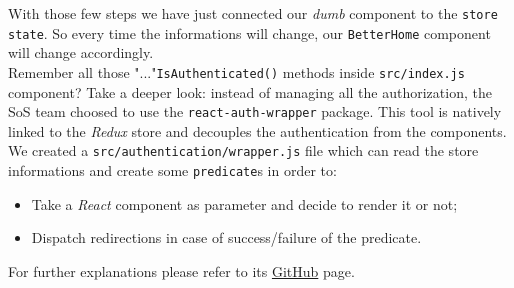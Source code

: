 With those few steps we have just connected our \emph{dumb} component to the \verb|store| \verb|state|. So every time the informations will change, our \verb|BetterHome| component will change accordingly.
\\Remember all those "..."\verb|IsAuthenticated()| methods inside \verb|src/index.js| component? Take a deeper look: instead of managing all the authorization, the SoS team choosed to use the \verb|react-auth-wrapper| package. This tool is natively linked to the \emph{Redux} store and decouples the authentication from the components. We created a \verb|src/authentication/wrapper.js| file which can read the store informations and create some \verb|predicate|s in order to:
\begin{itemize}
	\item Take a \emph{React} component as parameter and decide to render it or not;
	\item Dispatch redirections in case of success/failure of the predicate.
\end{itemize}
For further explanations please refer to its \href{https://github.com/mjrussell/redux-auth-wrapper}{GitHub} page.


